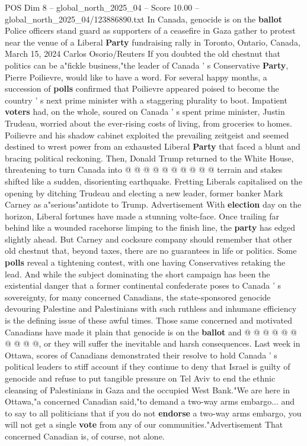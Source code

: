 \begin{textsample}{POS Dim 8 – global\_north\_2025\_04 – Score 10.00 – global\_north\_2025\_04/123886890.txt}  \label{ex:f8_pos_369}
In Canada, genocide is on the \textbf{ballot} Police officers stand guard as supporters of a ceasefire in Gaza gather to protest near the venue of a Liberal \textbf{Party} fundraising rally in Toronto, Ontario, Canada, March 15, 2024 Carlos Osorio/Reuters If you doubted the old chestnut that politics can be a"fickle business,"the leader of Canada ' s Conservative \textbf{Party}, Pierre Poilievre, would like to have a word.
For several happy months, a succession of \textbf{polls} confirmed that Poilievre appeared poised to become the country ' s next prime minister with a staggering plurality to boot.
Impatient \textbf{voters} had, on the whole, soured on Canada ' s spent prime minister, Justin Trudeau, worried about the ever-rising costs of living, from groceries to homes.
Poilievre and his shadow cabinet exploited the prevailing zeitgeist and seemed destined to wrest power from an exhausted Liberal \textbf{Party} that faced a blunt and bracing political reckoning.
Then, Donald Trump returned to the White House, threatening to turn Canada into @ @ @ @ @ @ @ @ @ @ terrain and stakes shifted like a sudden, disorienting earthquake.
Fretting Liberals capitalised on the opening by ditching Trudeau and electing a new leader, former banker Mark Carney as a"serious"antidote to Trump.
Advertisement With \textbf{election} day on the horizon, Liberal fortunes have made a stunning volte-face.
Once trailing far behind like a wounded racehorse limping to the finish line, the \textbf{party} has edged slightly ahead.
But Carney and cocksure company should remember that other old chestnut that, beyond taxes, there are no guarantees in life or politics.
Some \textbf{polls} reveal a tightening contest, with one having Conservatives retaking the lead.
And while the subject dominating the short campaign has been the existential danger that a former continental confederate poses to Canada ' s sovereignty, for many concerned Canadians, the state-sponsored genocide devouring Palestine and Palestinians with such ruthless and inhumane efficiency is the defining issue of these awful times.
Those same concerned and motivated Canadians have made it plain that genocide is on the \textbf{ballot} and @ @ @ @ @ @ @ @ @ @, or they will suffer the inevitable and harsh consequences.
Last week in Ottawa, scores of Canadians demonstrated their resolve to hold Canada ' s political leaders to stiff account if they continue to deny that Israel is guilty of genocide and refuse to put tangible pressure on Tel Aviv to end the ethnic cleansing of Palestinians in Gaza and the occupied West Bank."We are here in Ottawa,"a concerned Canadian said,"to demand a two-way arms embargo... and to say to all politicians that if you do not \textbf{endorse} a two-way arms embargo, you will not get a single \textbf{vote} from any of our communities."Advertisement That concerned Canadian is, of course, not alone.

\end{textsample}
